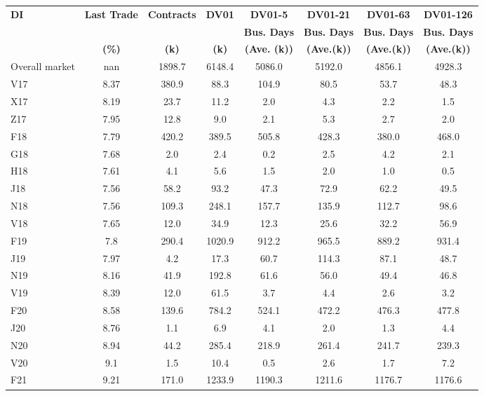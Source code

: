 \documentclass[article,crop=false]{standalone}%
\begin{document}
%
\normalsize%
\setlength{\tabcolsep}{0.15cm}%
\begin{tabular}[h]{l c c c c c c c}%
\hline%
\rowcolor{white}%
\textbf{DI}&\textbf{Last Trade}&\textbf{Contracts}&\textbf{DV01}&\textbf{DV01{-}5}&\textbf{DV01{-}21}&\textbf{DV01{-}63}&\textbf{DV01{-}126}\\%
\rowcolor{white}%
\textbf{}&\textbf{}&\textbf{}&\textbf{}&\textbf{Bus. Days}&\textbf{Bus. Days}&\textbf{Bus. Days}&\textbf{Bus. Days}\\%
\rowcolor{white}%
\textbf{}&\textbf{(\%)}&\textbf{(k)}&\textbf{(k)}&\textbf{(Ave. (k))}&\textbf{(Ave.(k))}&\textbf{(Ave.(k))}&\textbf{(Ave.(k))}\\%
\hline%
\rowcolor{lightgray}%
Overall market&nan&1898.7&6148.4&5086.0&5192.0&4856.1&4928.3\\%
\rowcolor{white}%
V17&8.37&380.9&88.3&104.9&80.5&53.7&48.3\\%
\rowcolor{lightgray}%
X17&8.19&23.7&11.2&2.0&4.3&2.2&1.5\\%
\rowcolor{white}%
Z17&7.95&12.8&9.0&2.1&5.3&2.7&2.0\\%
\rowcolor{lightgray}%
F18&7.79&420.2&389.5&505.8&428.3&380.0&468.0\\%
\rowcolor{white}%
G18&7.68&2.0&2.4&0.2&2.5&4.2&2.1\\%
\rowcolor{lightgray}%
H18&7.61&4.1&5.6&1.5&2.0&1.0&0.5\\%
\rowcolor{white}%
J18&7.56&58.2&93.2&47.3&72.9&62.2&49.5\\%
\rowcolor{lightgray}%
N18&7.56&109.3&248.1&157.7&135.9&112.7&98.6\\%
\rowcolor{white}%
V18&7.65&12.0&34.9&12.3&25.6&32.2&56.9\\%
\rowcolor{lightgray}%
F19&7.8&290.4&1020.9&912.2&965.5&889.2&931.4\\%
\rowcolor{white}%
J19&7.97&4.2&17.3&60.7&114.3&87.1&48.7\\%
\rowcolor{lightgray}%
N19&8.16&41.9&192.8&61.6&56.0&49.4&46.8\\%
\rowcolor{white}%
V19&8.39&12.0&61.5&3.7&4.4&2.6&3.2\\%
\rowcolor{lightgray}%
F20&8.58&139.6&784.2&524.1&472.2&476.3&477.8\\%
\rowcolor{white}%
J20&8.76&1.1&6.9&4.1&2.0&1.3&4.4\\%
\rowcolor{lightgray}%
N20&8.94&44.2&285.4&218.9&261.4&241.7&239.3\\%
\rowcolor{white}%
V20&9.1&1.5&10.4&0.5&2.6&1.7&7.2\\%
\rowcolor{lightgray}%
F21&9.21&171.0&1233.9&1190.3&1211.6&1176.7&1176.6\\%

\end{tabular}
\end{document}
